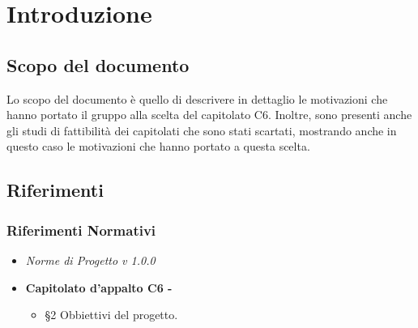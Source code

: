 \documentclass[StudioDiFattibilità.tex]{subfiles}
\begin{document}
\chapter{Introduzione}
\section{Scopo del documento}
Lo scopo del documento è quello di descrivere in dettaglio le motivazioni che hanno portato il gruppo alla scelta del capitolato C6. Inoltre, sono presenti anche gli studi di fattibilità dei capitolati che sono stati scartati, mostrando anche in questo caso le motivazioni che hanno portato a questa scelta.
\scopoProdotto
\glossExpl
\section{Riferimenti}
\subsection{Riferimenti Normativi}
\begin{itemize}
	\item \textit{Norme di Progetto v 1.0.0}
	\item \textbf{Capitolato d'appalto C6 - \progetto}\\
	\begin{itemize}
		\item \S2 Obbiettivi del progetto.
	\end{itemize}
\end{itemize}
\end{document}
